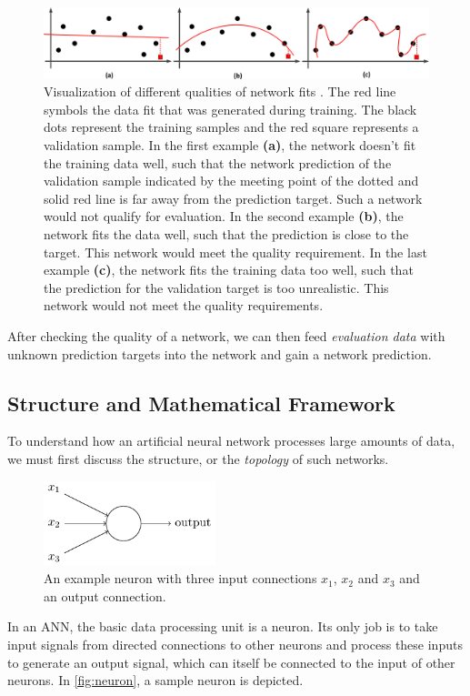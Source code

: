 \begin{figure}[H]
  \includegraphics[width=\linewidth]{media/networkquality.png}
  \caption{Visualization of different qualities of network fits \cite{underfit}. The red line symbols the data fit that was generated during training. The black dots represent the training samples and the red square represents a validation sample. In the first example \textbf{(a)}, the network doesn't fit the training data well, such that the network prediction of the validation sample indicated by the meeting point of the dotted and solid red line is far away from the prediction target. Such a network would not qualify for evaluation. In the second example \textbf{(b)}, the network fits the data well, such that the prediction is close to the target. This network would meet the quality requirement. In the last example \textbf{(c)}, the network fits the training data too well, such that the prediction for the validation target is too unrealistic. This network would not meet the quality requirements.}
  \label{fig:fitting}
\end{figure}

After checking the quality of a network, we can then feed \textit{evaluation data} with unknown prediction targets into the network and gain a network prediction.

\subsection{Structure and Mathematical Framework}
To understand how an artificial neural network processes large amounts of data,
we must first discuss the structure, or the \textit{topology} of such networks.


\begin{figure}
  \includegraphics[width=5cm]{media/neuron.png}
  \caption{
    An example neuron with three input connections $x_1$, $x_2$ and
    $x_3$ and an output connection. \cite{nielsen}
  }
  \label{fig:neuron}
\end{figure}
In an ANN, the basic data processing unit is a neuron. Its only job is to take
input signals from directed connections to other neurons and process these inputs to generate an output signal, which can itself be connected to the input of other neurons. In \autoref{fig:neuron}, a sample neuron is depicted.


